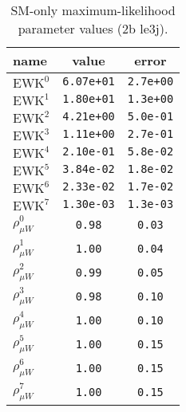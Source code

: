 \documentclass{article}
\begin{document}
\begin{table}\centering
\caption{SM-only maximum-likelihood parameter values (2b le3j).}
\label{tab:mlParameterValues2b_le3j}
\begin{tabular}{lcc}name & value & error \\ \hline
$\mathrm{EWK}^{0}$ & {\tt  6.07e+01} & {\tt  2.7e+00}\\
$\mathrm{EWK}^{1}$ & {\tt  1.80e+01} & {\tt  1.3e+00}\\
$\mathrm{EWK}^{2}$ & {\tt  4.21e+00} & {\tt  5.0e-01}\\
$\mathrm{EWK}^{3}$ & {\tt  1.11e+00} & {\tt  2.7e-01}\\
$\mathrm{EWK}^{4}$ & {\tt  2.10e-01} & {\tt  5.8e-02}\\
$\mathrm{EWK}^{5}$ & {\tt  3.84e-02} & {\tt  1.8e-02}\\
$\mathrm{EWK}^{6}$ & {\tt  2.33e-02} & {\tt  1.7e-02}\\
$\mathrm{EWK}^{7}$ & {\tt  1.30e-03} & {\tt  1.3e-03}\\
$\rho_{\mu W}^{0}$ & {\tt 0.98} & {\tt 0.03}\\
$\rho_{\mu W}^{1}$ & {\tt 1.00} & {\tt 0.04}\\
$\rho_{\mu W}^{2}$ & {\tt 0.99} & {\tt 0.05}\\
$\rho_{\mu W}^{3}$ & {\tt 0.98} & {\tt 0.10}\\
$\rho_{\mu W}^{4}$ & {\tt 1.00} & {\tt 0.10}\\
$\rho_{\mu W}^{5}$ & {\tt 1.00} & {\tt 0.15}\\
$\rho_{\mu W}^{6}$ & {\tt 1.00} & {\tt 0.15}\\
$\rho_{\mu W}^{7}$ & {\tt 1.00} & {\tt 0.15}\\
\hline
\end{tabular}
\end{table}
\end{document}
